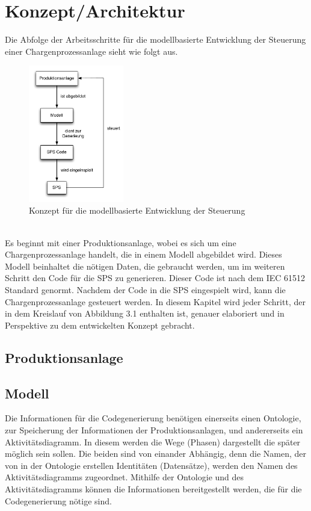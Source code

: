 
\chapter{Konzept/Architektur} \label{chapter:architecture}
Die Abfolge der Arbeitsschritte für die modellbasierte Entwicklung der Steuerung einer Chargenprozessanlage sieht wie folgt aus. 
\begin{figure}[h!]
		\centering
		\includegraphics[width=0.37\textwidth]{graphics/konzept/konzept_allblack.pdf}
		\caption{Konzept für die modellbasierte Entwicklung der Steuerung}
\end{figure} \\
Es beginnt mit einer Produktionsanlage, wobei es sich um eine Chargenprozessanlage handelt, die in einem Modell abgebildet wird. Dieses Modell beinhaltet die nötigen Daten, die gebraucht werden, um im weiteren Schritt den Code für die SPS zu generieren. Dieser Code ist nach dem IEC 61512 Standard genormt. Nachdem der Code in die SPS eingespielt wird, kann die Chargenprozessanlage gesteuert werden. 
In diesem Kapitel wird jeder Schritt, der in dem Kreislauf von Abbildung 3.1 enthalten ist, genauer elaboriert und in Perspektive zu dem entwickelten Konzept gebracht.
\section{Produktionsanlage}
\section{Modell}
Die Informationen für die Codegenerierung benötigen einerseits einen Ontologie, zur Speicherung der Informationen der Produktionsanlagen,  und andererseits ein Aktivitätsdiagramm. In diesem werden die Wege (Phasen) dargestellt die später möglich sein sollen.
Die beiden sind von einander Abhängig, denn die Namen, der von in der Ontologie erstellen Identitäten (Datensätze), werden den Namen des Aktivitätsdiagramms zugeordnet.
Mithilfe der Ontologie und des Aktivitätsdiagramms können die Informationen bereitgestellt werden, die für die Codegenerierung nötige sind.  

